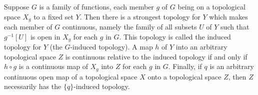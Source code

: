 Suppose $G$ is a family of functions, each member $g$ of $G$ being on a topological space $X_g$ to a fixed set $Y$. Then there is a strongest topology for $Y$ which makes each member of $G$ continuous, namely the family of all subsets $U$ of $Y$ such that $g^{-1}[U]$ is open in $X_g$ for each $g$ in $G$. This topology is called the induced topology for $Y$ (the $G$-induced topology). A map $h$ of $Y$ into an arbitrary topological space $Z$ is continuous relative to the induced topology if and only if $h \circ g$ is a continuous map of $X_g$ into $Z$ for each $g$ in $G$. Finally, if $q$ is an arbitrary continuous open map of a topological space $X$ onto a topological space $Z$, then $Z$ necessarily has the $\{q\}$-induced topology.
